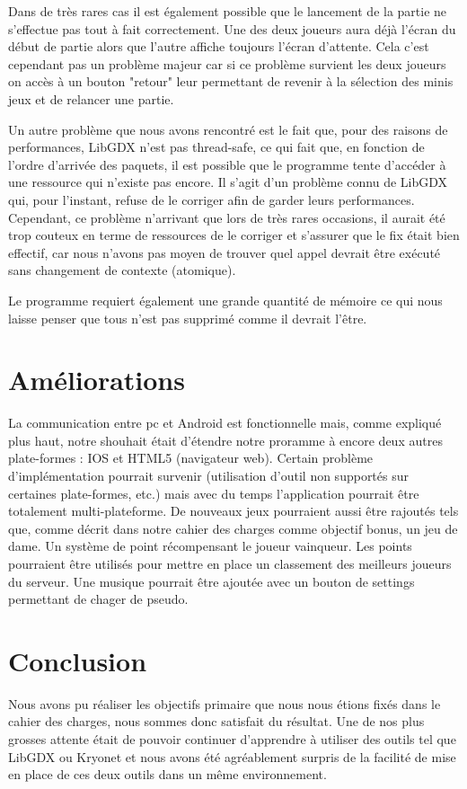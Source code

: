 \documentclass{report}
\begin{document}
Dans de très rares cas il est également possible que le lancement de la partie ne s'effectue pas tout à fait correctement. Une des deux joueurs aura déjà l'écran du début de partie alors
que l'autre affiche toujours l'écran d'attente. Cela c'est cependant pas un problème majeur car si ce problème survient les deux joueurs on accès à un bouton "retour" leur
permettant de revenir à la sélection des minis jeux et de relancer une partie.

Un autre problème que nous avons rencontré est le fait que, pour des raisons de performances, LibGDX n'est pas thread-safe, ce qui fait que, en fonction de l'ordre d'arrivée des paquets, il est possible que le programme tente d'accéder à une ressource qui n'existe pas encore. Il s'agit d'un problème connu de LibGDX qui, pour l'instant, refuse de le corriger afin de garder leurs performances. Cependant, ce problème n'arrivant que lors de très rares occasions, il aurait été trop couteux en terme de ressources de le corriger et s'assurer que le fix était bien effectif, car nous n'avons pas moyen de trouver quel appel devrait être exécuté sans changement de contexte (atomique).

Le programme requiert également une grande quantité de mémoire ce qui nous laisse penser que tous n'est pas supprimé comme il devrait l'être.

\chapter{Améliorations}
La communication entre pc et Android est fonctionnelle mais, comme expliqué plus haut, notre shouhait était d'étendre notre proramme à encore deux autres
plate-formes : IOS et HTML5 (navigateur web). Certain problème d'implémentation pourrait survenir (utilisation d'outil non supportés sur certaines plate-formes, etc.)
mais avec du temps l'application pourrait être totalement multi-plateforme.
De nouveaux jeux pourraient aussi être rajoutés tels que, comme décrit dans notre cahier des charges comme objectif bonus,
un jeu de dame. Un système de point récompensant le joueur vainqueur. Les points pourraient être utilisés pour mettre en place un classement des meilleurs joueurs du serveur. Une musique pourrait être ajoutée avec un bouton de settings permettant de chager de pseudo.

\chapter{Conclusion}
Nous avons pu réaliser les objectifs primaire que nous nous étions fixés dans le cahier des charges, nous
sommes donc satisfait du résultat. Une de nos plus grosses attente était de pouvoir continuer d'apprendre à
utiliser des outils tel que LibGDX ou Kryonet et nous avons été agréablement surpris de la facilité de mise
en place de ces deux outils dans un même environnement.
\end{document}
